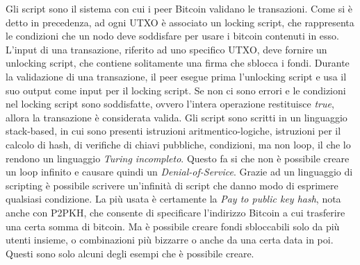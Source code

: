 Gli script sono il sistema con cui i peer Bitcoin validano le transazioni. Come si è detto in precedenza, ad ogni UTXO è associato un locking script, che rappresenta le condizioni che un nodo deve soddisfare per usare i bitcoin contenuti in esso. L'input di una transazione, riferito ad uno specifico UTXO, deve fornire un unlocking script, che contiene solitamente una firma che sblocca i fondi. Durante la validazione di una transazione, il peer esegue prima l'unlocking script e usa il suo output come input per il locking script. Se non ci sono errori e le condizioni nel locking script sono soddisfatte, ovvero l'intera operazione restituisce \emph{true}, allora la transazione è considerata valida.
Gli script sono scritti in un linguaggio stack-based, in cui sono presenti istruzioni aritmentico-logiche, istruzioni per il calcolo di hash, di verifiche di chiavi pubbliche, condizioni, ma non loop, il che lo rendono un linguaggio \emph{Turing incompleto}. Questo fa si che non è possibile creare un loop infinito e causare quindi un \emph{Denial-of-Service}. Grazie ad un linguaggio di scripting è possibile scrivere un'infinità di script che danno modo di esprimere qualsiasi condizione. La più usata è certamente la \emph{Pay to public key hash}, nota anche con P2PKH, che consente di specificare l'indirizzo Bitcoin a cui trasferire una certa somma di bitcoin. Ma è possibile creare fondi sbloccabili solo da più utenti insieme, o combinazioni più bizzarre o anche da una certa data in poi. Questi sono solo alcuni degli esempi che è possibile creare.

